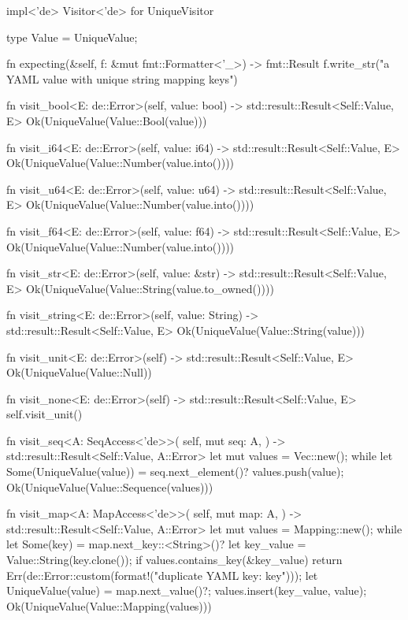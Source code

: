 impl<'de> Visitor<'de> for UniqueVisitor {
    type Value = UniqueValue;

    fn expecting(&self, f: &mut fmt::Formatter<'_>) -> fmt::Result {
        f.write_str("a YAML value with unique string mapping keys")
    }

    fn visit_bool<E: de::Error>(self, value: bool) -> std::result::Result<Self::Value, E> {
        Ok(UniqueValue(Value::Bool(value)))
    }

    fn visit_i64<E: de::Error>(self, value: i64) -> std::result::Result<Self::Value, E> {
        Ok(UniqueValue(Value::Number(value.into())))
    }

    fn visit_u64<E: de::Error>(self, value: u64) -> std::result::Result<Self::Value, E> {
        Ok(UniqueValue(Value::Number(value.into())))
    }

    fn visit_f64<E: de::Error>(self, value: f64) -> std::result::Result<Self::Value, E> {
        Ok(UniqueValue(Value::Number(value.into())))
    }

    fn visit_str<E: de::Error>(self, value: &str) -> std::result::Result<Self::Value, E> {
        Ok(UniqueValue(Value::String(value.to_owned())))
    }

    fn visit_string<E: de::Error>(self, value: String) -> std::result::Result<Self::Value, E> {
        Ok(UniqueValue(Value::String(value)))
    }

    fn visit_unit<E: de::Error>(self) -> std::result::Result<Self::Value, E> {
        Ok(UniqueValue(Value::Null))
    }

    fn visit_none<E: de::Error>(self) -> std::result::Result<Self::Value, E> {
        self.visit_unit()
    }

    fn visit_seq<A: SeqAccess<'de>>(
        self,
        mut seq: A,
    ) -> std::result::Result<Self::Value, A::Error> {
        let mut values = Vec::new();
        while let Some(UniqueValue(value)) = seq.next_element()? {
            values.push(value);
        }
        Ok(UniqueValue(Value::Sequence(values)))
    }

    fn visit_map<A: MapAccess<'de>>(
        self,
        mut map: A,
    ) -> std::result::Result<Self::Value, A::Error> {
        let mut values = Mapping::new();
        while let Some(key) = map.next_key::<String>()? {
            let key_value = Value::String(key.clone());
            if values.contains_key(&key_value) {
                return Err(de::Error::custom(format!("duplicate YAML key: {key}")));
            }
            let UniqueValue(value) = map.next_value()?;
            values.insert(key_value, value);
        }
        Ok(UniqueValue(Value::Mapping(values)))
    }
}

